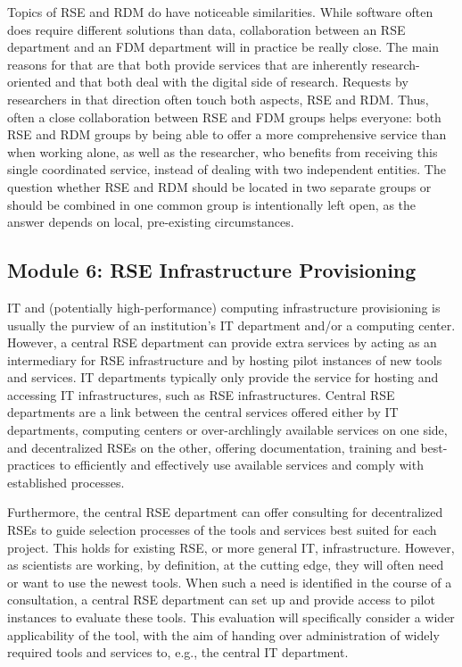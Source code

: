 \documentclass[a4paper]{article}
\begin{document}
Topics of RSE and RDM do have noticeable similarities.
While software often does require different solutions than data, collaboration between an RSE department and an FDM department will in practice be really close.
The main reasons for that are that both provide services that are inherently research-oriented and that both deal with the digital side of research.
Requests by researchers in that direction often touch both aspects, RSE and RDM.
Thus, often a close collaboration between RSE and FDM groups helps everyone: both RSE and RDM groups by being able to offer a more comprehensive service than when working alone, as well as the researcher, who benefits from receiving this single coordinated service, instead of dealing with two independent entities.
The question whether RSE and RDM should be located in two separate groups or should be combined in one common group is intentionally left open, as the answer depends on local, pre-existing circumstances.

\subsection{Module 6: RSE Infrastructure Provisioning}
\label{sec:infrastructure}

IT and (potentially high-performance) computing infrastructure provisioning is usually the purview of an institution's IT department and/or a computing center.
However, a central RSE department can provide extra services by acting as an intermediary for RSE infrastructure and by hosting pilot instances of new tools and services.
IT departments typically only provide the service for hosting and accessing IT infrastructures, such as RSE infrastructures.
Central RSE departments are a link between the central services offered either by IT departments, computing centers or over-archlingly available services on one side,
and decentralized RSEs on the other, offering documentation, training and best-practices to efficiently and effectively use available services and comply with established processes.

Furthermore, the central RSE department can offer consulting for decentralized RSEs to guide selection processes of the tools and services best suited for each project.
This holds for existing RSE, or more general IT, infrastructure.
However, as scientists are working, by definition, at the cutting edge, they will often need or want to use the newest tools.
When such a need is identified in the course of a consultation, a central RSE department can set up and provide access to pilot instances to evaluate these tools.
This evaluation will specifically consider a wider applicability of the tool, with the aim of handing over administration of widely required tools and services to, e.g., the central IT department.
\end{document}
